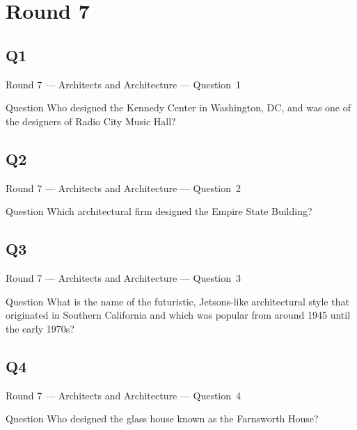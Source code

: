 \documentclass[11pt]{beamer}
\begin{document}
\section{Round 7}
\subsection*{Q1}
\begin{frame}[t]{Round 7 --- Architects and Architecture --- \mbox{Question 1}}
\vspace{-0.5em}
\begin{block}{Question}
Who designed the Kennedy Center in Washington, DC, and was one of the designers of Radio City Music Hall?
\end{block}
\end{frame}
\subsection*{Q2}
\begin{frame}[t]{Round 7 --- Architects and Architecture --- \mbox{Question 2}}
\vspace{-0.5em}
\begin{block}{Question}
Which architectural firm designed the Empire State Building?
\end{block}
\end{frame}
\subsection*{Q3}
\begin{frame}[t]{Round 7 --- Architects and Architecture --- \mbox{Question 3}}
\vspace{-0.5em}
\begin{block}{Question}
What is the name of the futuristic, Jetsons-like architectural style that originated in Southern California and which was popular from around 1945 until the early 1970s?
\end{block}
\end{frame}
\subsection*{Q4}
\begin{frame}[t]{Round 7 --- Architects and Architecture --- \mbox{Question 4}}
\vspace{-0.5em}
\begin{block}{Question}
Who designed the glass house known as the Farnsworth House?
\end{block}
\end{frame}
\end{document}

